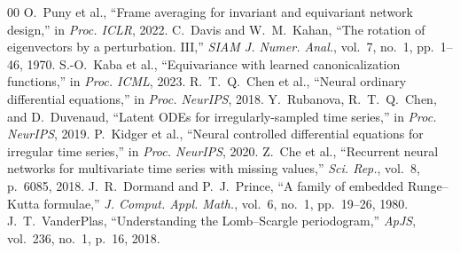 \documentclass[10pt,twocolumn,letterpaper]{article}
\begin{document}
\begin{thebibliography}{00}
 O.~Puny et al., ``Frame averaging for invariant and equivariant network design,'' in \textit{Proc. ICLR}, 2022.
 C.~Davis and W.~M.~Kahan, ``The rotation of eigenvectors by a perturbation. III,'' \textit{SIAM J. Numer. Anal.}, vol.~7, no.~1, pp.~1--46, 1970.
 S.-O.~Kaba et al., ``Equivariance with learned canonicalization functions,'' in \textit{Proc. ICML}, 2023.
 R.~T.~Q.~Chen et al., ``Neural ordinary differential equations,'' in \textit{Proc. NeurIPS}, 2018.
 Y.~Rubanova, R.~T.~Q.~Chen, and D.~Duvenaud, ``Latent ODEs for irregularly-sampled time series,'' in \textit{Proc. NeurIPS}, 2019.
 P.~Kidger et al., ``Neural controlled differential equations for irregular time series,'' in \textit{Proc. NeurIPS}, 2020.
 Z.~Che et al., ``Recurrent neural networks for multivariate time series with missing values,'' \textit{Sci. Rep.}, vol.~8, p.~6085, 2018.
 J.~R.~Dormand and P.~J.~Prince, ``A family of embedded Runge--Kutta formulae,'' \textit{J. Comput. Appl. Math.}, vol.~6, no.~1, pp.~19--26, 1980.
 J.~T.~VanderPlas, ``Understanding the Lomb--Scargle periodogram,'' \textit{ApJS}, vol.~236, no.~1, p.~16, 2018.
\end{thebibliography}
\end{document}

